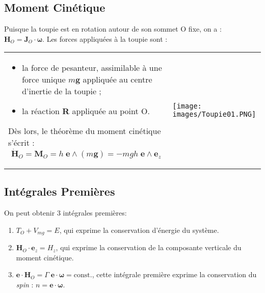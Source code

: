 \documentclass[a4paper]{article}
\begin{document}
\subsection{Moment Cinétique}





Puisque la toupie est en rotation autour de son sommet O fixe, on a : $ \textbf{H}_O = \textbf{J}_O \cdot \boldsymbol{\omega} $. Les forces appliquées à la toupie sont :

\begin{tabular}{M{7cm}M{8cm}}
\begin{itemize}
    \item la force de pesanteur, assimilable à une force unique $ m \textbf{g} $ appliquée au centre d’inertie de la toupie ;
    \item la réaction \textbf{R} appliquée au point O.
\end{itemize}
Dès lors, le théorème du moment cinétique s’écrit : 
\[ \dot{\textbf{H}}_O = \textbf{M}_O = h \; \textbf{e} \wedge (m \textbf{g}) = - m g h \; \textbf{e} \wedge \textbf{e}_z \]
&
\begin{center} \texttt{[image: images/Toupie01.PNG]} \end{center}
\end{tabular}





\subsection{Intégrales Premières}





On peut obtenir 3 intégrales premières: 
\begin{enumerate}

\item $ T_O + V_{m g} = E $, qui exprime la conservation d'énergie du système.
\item $ \textbf{H}_O \cdot \textbf{e}_z = H_z $, qui exprime la conservation de la composante verticale du moment cinétique.
\item $ \textbf{e} \cdot \textbf{H}_O = \Gamma \; \textbf{e} \cdot \boldsymbol{\omega} = \text{const.} $, cette intégrale première exprime la conservation du \emph{spin} : $ n = \textbf{e} \cdot \boldsymbol{\omega} $.

\end{enumerate}
\end{document}
